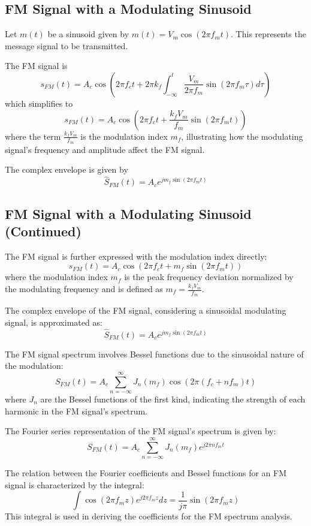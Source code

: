 \subsection*{FM Signal with a Modulating Sinusoid}

Let \( m(t) \) be a sinusoid given by \( m(t) = V_m \cos(2\pi f_m t) \). This represents the message signal to be transmitted.

The FM signal is
\[
s_{FM}(t) = A_c \cos \left( 2\pi f_c t + 2\pi k_f \int_{-\infty}^{t} \frac{V_m}{2\pi f_m} \sin(2\pi f_m \tau) d\tau \right)
\]
which simplifies to
\[
s_{FM}(t) = A_c \cos \left(2\pi f_c t + \frac{k_f V_m}{f_m} \sin(2\pi f_m t) \right)
\]
where the term \( \frac{k_f V_m}{f_m} \) is the modulation index \( m_f \), illustrating how the modulating signal's frequency and amplitude affect the FM signal.

The complex envelope is given by
\[
\hat{S}_{FM}(t) = A_c e^{j m_f \sin(2\pi f_m t)}
\]
\subsection*{FM Signal with a Modulating Sinusoid (Continued)}

The FM signal is further expressed with the modulation index directly:
\[
s_{FM}(t) = A_c \cos \left(2\pi f_c t + m_f \sin(2\pi f_m t) \right)
\]
where the modulation index \( m_f \) is the peak frequency deviation normalized by the modulating frequency and is defined as \( m_f = \frac{k_f V_m}{f_m} \).

The complex envelope of the FM signal, considering a sinusoidal modulating signal, is approximated as:
\[
\hat{S}_{FM}(t) = A_c e^{j m_f \sin(2\pi f_m t)}
\]

The FM signal spectrum involves Bessel functions due to the sinusoidal nature of the modulation:
\[
S_{FM}(t) = A_c \sum_{n=-\infty}^{\infty} J_n(m_f) \cos(2\pi (f_c + nf_m)t)
\]
where \( J_n \) are the Bessel functions of the first kind, indicating the strength of each harmonic in the FM signal's spectrum.

The Fourier series representation of the FM signal's spectrum is given by:
\[
S_{FM}(t) = A_c \sum_{n=-\infty}^{\infty} J_n(m_f) e^{j 2\pi n f_m t}
\]

The relation between the Fourier coefficients and Bessel functions for an FM signal is characterized by the integral:
\[
\int \cos(2\pi f_m z) e^{j 2\pi f_m z} dz = \frac{1}{j \pi} \sin(2\pi f_m z)
\]
This integral is used in deriving the coefficients for the FM spectrum analysis.





